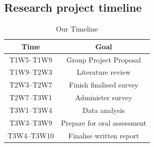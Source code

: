 \documentclass{article}
\begin{document}
\printbibliography[heading=bibintoc,title={References}]

\newpage

\begin{appendices}
  \section{Research project timeline}
  \begin{table}[h!]
    \begin{center}
      \caption{Our Timeline}
      \label{tab:timeline}
      \begin{tabular}{|c|c|}
        \rowcolor{cyan}
        \textbf{Time} & \textbf{Goal} \\ \hline
        T1W5--T1W9 & Group Project Proposal \\ \hline
        \rowcolor{gray}
        T1W9--T2W3 & Literature review \\ \hline
        T2W3--T2W7 & Finish finalised survey \\ \hline
        \rowcolor{gray}
        T2W7--T3W1 & Administer survey \\ \hline
        T3W1--T3W4 & Data analysis \\ \hline
        \rowcolor{gray}
        T3W3--T3W9 & Prepare for oral assessment \\ \hline
        T3W4--T3W10 & Finalise written report \\ \hline
      \end{tabular}
    \end{center}
  \end{table}
\end{appendices}
\end{document}
